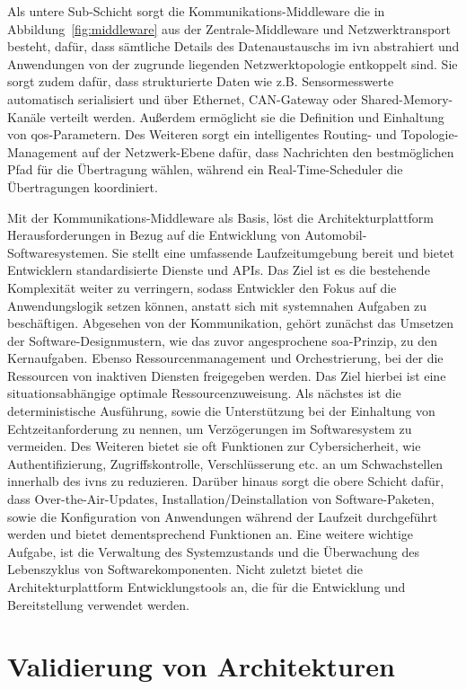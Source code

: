 Als untere Sub-Schicht sorgt die Kommunikations-Middleware die in Abbildung~\ref{fig:middleware} aus der Zentrale-Middleware und Netzwerktransport besteht, dafür, dass sämtliche Details des Datenaustauschs im \gls{ivn} abstrahiert und Anwendungen von der zugrunde liegenden Netzwerktopologie entkoppelt sind. Sie sorgt zudem dafür, dass strukturierte Daten wie z.B. Sensormesswerte automatisch serialisiert und über Ethernet, CAN-Gateway oder Shared-Memory-Kanäle verteilt werden. Außerdem ermöglicht sie die Definition und Einhaltung von \gls{qos}-Parametern. Des Weiteren sorgt ein intelligentes Routing- und Topologie-Management auf der Netzwerk-Ebene dafür, dass Nachrichten den bestmöglichen Pfad für die Übertragung wählen, während ein Real-Time-Scheduler die Übertragungen koordiniert.

Mit der Kommunikations-Middleware als Basis, löst die Architekturplattform Herausforderungen in Bezug auf die Entwicklung von Automobil-Softwaresystemen. Sie stellt eine umfassende Laufzeitumgebung bereit und bietet Entwicklern standardisierte Dienste und APIs. Das Ziel ist es die bestehende Komplexität weiter zu verringern, sodass Entwickler den Fokus auf die Anwendungslogik setzen können, anstatt sich mit systemnahen Aufgaben zu beschäftigen. Abgesehen von der Kommunikation, gehört zunächst das Umsetzen der Software-Designmustern, wie das zuvor angesprochene \gls{soa}-Prinzip, zu den Kernaufgaben. Ebenso Ressourcenmanagement und Orchestrierung, bei der die Ressourcen von inaktiven Diensten freigegeben werden. Das Ziel hierbei ist eine situationsabhängige optimale Ressourcenzuweisung. Als nächstes ist die deterministische Ausführung, sowie die Unterstützung bei der Einhaltung von Echtzeitanforderung zu nennen, um Verzögerungen im Softwaresystem zu vermeiden. Des Weiteren bietet sie oft Funktionen zur Cybersicherheit, wie Authentifizierung, Zugriffskontrolle, Verschlüsserung etc. an um Schwachstellen innerhalb des \glspl{ivn} zu reduzieren. Darüber hinaus sorgt die obere Schicht dafür, dass Over-the-Air-Updates, Installation/Deinstallation von Software-Paketen, sowie die Konfiguration von Anwendungen während der Laufzeit durchgeführt werden und bietet dementsprechend Funktionen an. Eine weitere wichtige Aufgabe, ist die Verwaltung des Systemzustands und die Überwachung des Lebenszyklus von Softwarekomponenten. Nicht zuletzt bietet die Architekturplattform Entwicklungstools an, die für die Entwicklung und Bereitstellung verwendet werden.

\section{Validierung von Architekturen}
\label{sect:validerung}

